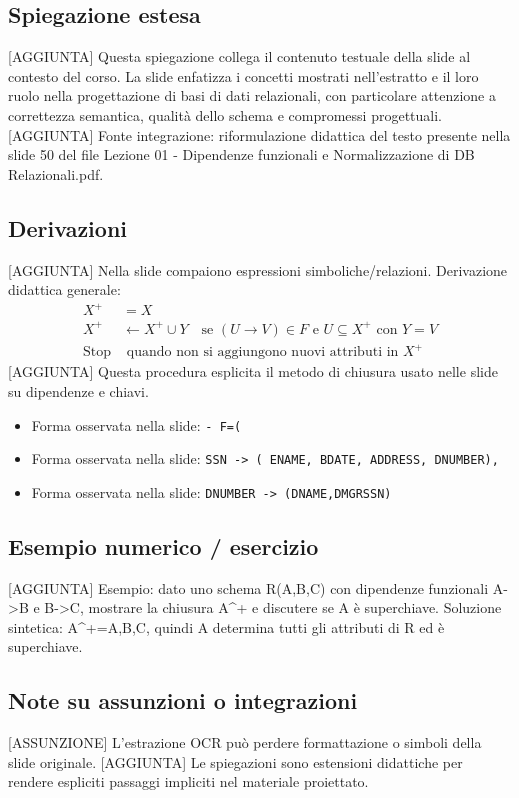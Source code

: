 \documentclass[11pt]{article}
\begin{document}
\subsection*{Spiegazione estesa}
[AGGIUNTA] Questa spiegazione collega il contenuto testuale della slide al contesto del corso. La slide enfatizza i concetti mostrati nell'estratto e il loro ruolo nella progettazione di basi di dati relazionali, con particolare attenzione a correttezza semantica, qualità dello schema e compromessi progettuali.
[AGGIUNTA] Fonte integrazione: riformulazione didattica del testo presente nella slide 50 del file Lezione 01 - Dipendenze funzionali e Normalizzazione di DB Relazionali.pdf.
\subsection*{Derivazioni}
[AGGIUNTA] Nella slide compaiono espressioni simboliche/relazioni. Derivazione didattica generale:
\begin{align*}
X^+ &= X \\
X^+ &\leftarrow X^+ \cup Y \quad \text{se } (U \to V) \in F \text{ e } U \subseteq X^+ \text{ con } Y=V \\
\text{Stop} &\text{ quando non si aggiungono nuovi attributi in } X^+
\end{align*}
[AGGIUNTA] Questa procedura esplicita il metodo di chiusura usato nelle slide su dipendenze e chiavi.
\begin{itemize}[leftmargin=*]
\item Forma osservata nella slide: \texttt{-    F=(}
\item Forma osservata nella slide: \texttt{SSN -> ( ENAME, BDATE, ADDRESS, DNUMBER),}
\item Forma osservata nella slide: \texttt{DNUMBER -> (DNAME,DMGRSSN)}
\end{itemize}
\subsection*{Esempio numerico / esercizio}
[AGGIUNTA] Esempio: dato uno schema R(A,B,C) con dipendenze funzionali A->B e B->C, mostrare la chiusura A^+ e discutere se A è superchiave. Soluzione sintetica: A^+={A,B,C}, quindi A determina tutti gli attributi di R ed è superchiave.
\subsection*{Note su assunzioni o integrazioni}
[ASSUNZIONE] L'estrazione OCR può perdere formattazione o simboli della slide originale.
[AGGIUNTA] Le spiegazioni sono estensioni didattiche per rendere espliciti passaggi impliciti nel materiale proiettato.
\end{document}

